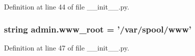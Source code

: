 Definition at line 44 of file \-\_\-\-\_\-init\-\_\-\-\_\-.\-py.

\hypertarget{namespaceadmin_a872d2f895c6e9da9390fc162ea3a251a}{
\subsubsection[{www\-\_\-root}]{\setlength{\rightskip}{0pt plus 5cm}string admin.\-www\-\_\-root = '/var/spool/www'}}\label{namespaceadmin_a872d2f895c6e9da9390fc162ea3a251a}


Definition at line 47 of file \-\_\-\-\_\-init\-\_\-\-\_\-.\-py.

